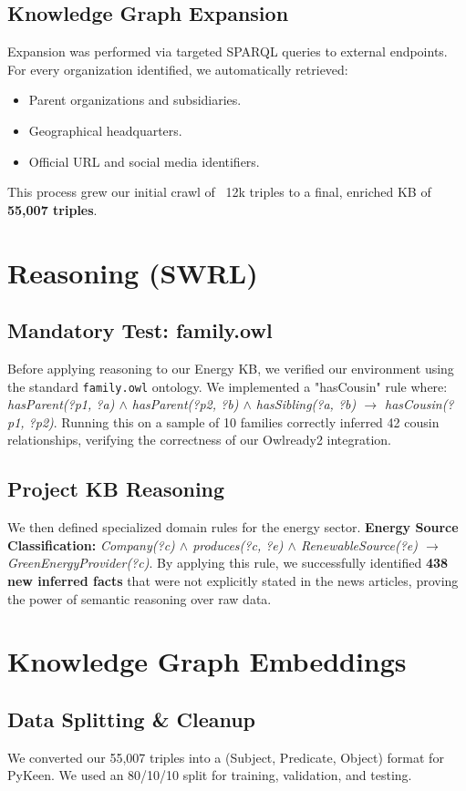\documentclass[11pt,a4paper]{article}
\begin{document}
\subsection{Knowledge Graph Expansion}
Expansion was performed via targeted SPARQL queries to external endpoints. For every organization identified, we automatically retrieved:
\begin{itemize}
    \item Parent organizations and subsidiaries.
    \item Geographical headquarters.
    \item Official URL and social media identifiers.
\end{itemize}
This process grew our initial crawl of ~12k triples to a final, enriched KB of \textbf{55,007 triples}.

\section{Reasoning (SWRL)}
\subsection{Mandatory Test: family.owl}
Before applying reasoning to our Energy KB, we verified our environment using the standard \texttt{family.owl} ontology. We implemented a "hasCousin" rule where:
\textit{hasParent(?p1, ?a) $\wedge$ hasParent(?p2, ?b) $\wedge$ hasSibling(?a, ?b) $\rightarrow$ hasCousin(?p1, ?p2)}.
Running this on a sample of 10 families correctly inferred 42 cousin relationships, verifying the correctness of our Owlready2 integration.

\subsection{Project KB Reasoning}
We then defined specialized domain rules for the energy sector.
\textbf{Energy Source Classification:} \textit{Company(?c) $\wedge$ produces(?c, ?e) $\wedge$ RenewableSource(?e) $\rightarrow$ GreenEnergyProvider(?c)}.
By applying this rule, we successfully identified \textbf{438 new inferred facts} that were not explicitly stated in the news articles, proving the power of semantic reasoning over raw data.

\section{Knowledge Graph Embeddings}
\subsection{Data Splitting \& Cleanup}
We converted our 55,007 triples into a (Subject, Predicate, Object) format for PyKeen. We used an 80/10/10 split for training, validation, and testing.
\end{document}
